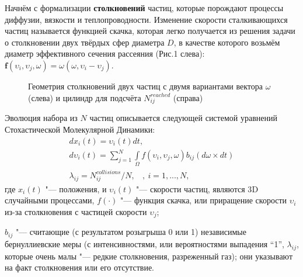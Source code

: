 Начнём с формализации \textbf{столкновений} частиц, которые порождают процессы диффузии, вязкости и теплопроводности.  Изменение скорости сталкивающихся частиц называется функцией скачка, которая легко получается из решения задачи о столкновении двух твёрдых сфер диаметра $ D $, в качестве которого возьмём диаметр эффективного сечения рассеяния (Рис.1 слева):
$\textbf{f}(\textbf{$\upsilon_{i}$},\textbf{$\upsilon_{j}$},\textbf{$\omega$}) = \textbf{$\omega$} (\textbf{$\omega$},\textbf{$\upsilon_{i}$} - \textbf{$\upsilon_{j}$})$.\\
\begin{figure}[h!]%
	\caption{Геометрия столкновений двух частиц с двумя вариантами вектора $\omega$ (слева) и цилиндр для подсчёта $N_{ij}^{reached}$ (справа)}
\end{figure}

Эволюция набора из $N$ частиц описывается следующей системой  уравнений Стохастической Молекулярной Динамики:
\begin{eqnarray}\label{SMD}
	 dx_{i}(t) = \upsilon_{i}(t) dt ,\ \ \  \nonumber \\
	 d\upsilon_{i}(t) = \sum\limits_{j=1}^N\int \limits_\Omega f(\upsilon_{i},\upsilon_{j},\omega)b_{ij}(d\omega\times dt) %
	 \\
	 \lambda_{ij} =N_{ij}^{collisions}/N , \ \ \ \ , \ i=1,...,N,\nonumber
  \end{eqnarray}
  где $x_{i}(t)$ "--- положения, и $\upsilon_{i}(t)$ "--- скорости частиц, являются 3{D} случайными процессами,
 $f(\cdot)$ "--- функция скачка, или приращение скорости $\upsilon_{i}$ из-за столкновения с частицей скорости $\upsilon_{j}$;

 $b_{ij}$ "--- считающие (с результатом розыгрыша 0 или 1) независимые бернуллиевские меры (с интенсивностями, или вероятностями выпадения ``1'',  $\lambda_{ij}$, которые  очень малы "--- редкие столкновения, разреженный газ); они указывают на факт столкновения или его отсутствие.



